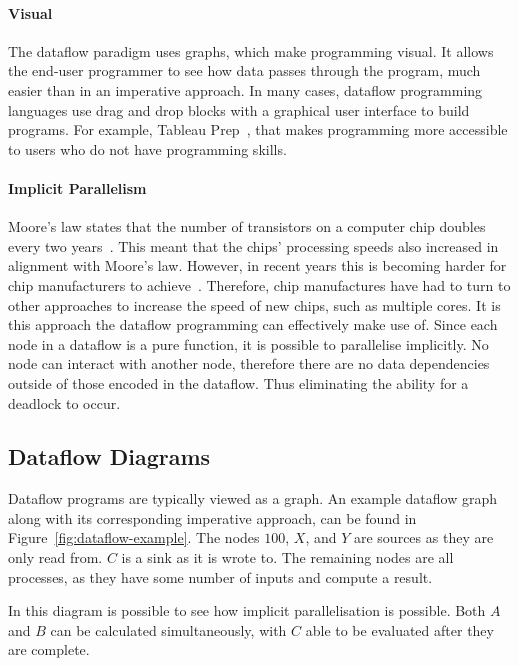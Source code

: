 \documentclass[dissertation.tex]{subfiles}
\begin{document}
\paragraph{Visual}
The dataflow paradigm uses graphs, which make programming visual.
It allows the end-user programmer to see how data passes through the program, much easier than in an imperative approach.
In many cases, dataflow programming languages use drag and drop blocks with a graphical user interface to build programs.
For example, Tableau Prep~\cite{tableauPrep}, that makes programming more accessible to users who do not have programming skills.

\paragraph{Implicit Parallelism}
Moore's law states that the number of transistors on a computer chip doubles every two years~\cite{4785860}.
This meant that the chips' processing speeds also increased in alignment with Moore's law.
However, in recent years this is becoming harder for chip manufacturers to achieve~\cite{bentley_2020}.
Therefore, chip manufactures have had to turn to other approaches to increase the speed of new chips, such as multiple cores.
It is this approach the dataflow programming can effectively make use of.
Since each node in a dataflow is a pure function, it is possible to parallelise implicitly.
No node can interact with another node, therefore there are no data dependencies outside of those encoded in the dataflow.
Thus eliminating the ability for a deadlock to occur.

\subsection{Dataflow Diagrams}
Dataflow programs are typically viewed as a graph.
An example dataflow graph along with its corresponding imperative approach, can be found in Figure~\ref{fig:dataflow-example}.
The nodes $100$, $X$, and $Y$ are sources as they are only read from. $C$ is a sink as it is wrote to.
The remaining nodes are all processes, as they have some number of inputs and compute a result.

In this diagram is possible to see how implicit parallelisation is possible.
Both $A$ and $B$ can be calculated simultaneously, with $C$ able to be evaluated after they are complete.
\end{document}

